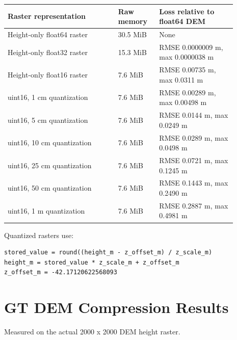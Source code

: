 \documentclass[10pt]{article}
\begin{document}
\begin{center}
\small
\begin{tabular}{p{0.43\linewidth}p{0.16\linewidth}p{0.30\linewidth}}
\toprule
Raster representation & Raw memory & Loss relative to float64 DEM \\
\midrule
Height-only float64 raster & 30.5 MiB & None \\
Height-only float32 raster & 15.3 MiB & RMSE 0.0000009 m, max 0.0000038 m \\
Height-only float16 raster & 7.6 MiB & RMSE 0.00735 m, max 0.0311 m \\
uint16, 1 cm quantization & 7.6 MiB & RMSE 0.00289 m, max 0.00498 m \\
uint16, 5 cm quantization & 7.6 MiB & RMSE 0.0144 m, max 0.0249 m \\
uint16, 10 cm quantization & 7.6 MiB & RMSE 0.0289 m, max 0.0498 m \\
uint16, 25 cm quantization & 7.6 MiB & RMSE 0.0721 m, max 0.1245 m \\
uint16, 50 cm quantization & 7.6 MiB & RMSE 0.1443 m, max 0.2490 m \\
uint16, 1 m quantization & 7.6 MiB & RMSE 0.2887 m, max 0.4981 m \\
\bottomrule
\end{tabular}
\end{center}

Quantized rasters use:

\begin{lstlisting}
stored_value = round((height_m - z_offset_m) / z_scale_m)
height_m = stored_value * z_scale_m + z_offset_m
z_offset_m = -42.17120622568093
\end{lstlisting}

\section{GT DEM Compression Results}

Measured on the actual 2000 x 2000 DEM height raster.
\end{document}

